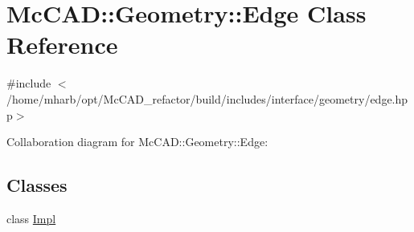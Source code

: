\hypertarget{classMcCAD_1_1Geometry_1_1Edge}{}\section{Mc\+C\+AD\+:\+:Geometry\+:\+:Edge Class Reference}
\label{classMcCAD_1_1Geometry_1_1Edge}


{\ttfamily \#include $<$/home/mharb/opt/\+Mc\+C\+A\+D\+\_\+refactor/build/includes/interface/geometry/edge.\+hpp$>$}



Collaboration diagram for Mc\+C\+AD\+:\+:Geometry\+:\+:Edge\+:
\subsection*{Classes}
\begin{DoxyCompactItemize}
\item 
class \hyperlink{classMcCAD_1_1Geometry_1_1Edge_1_1Impl}{Impl}
\end{DoxyCompactItemize}
